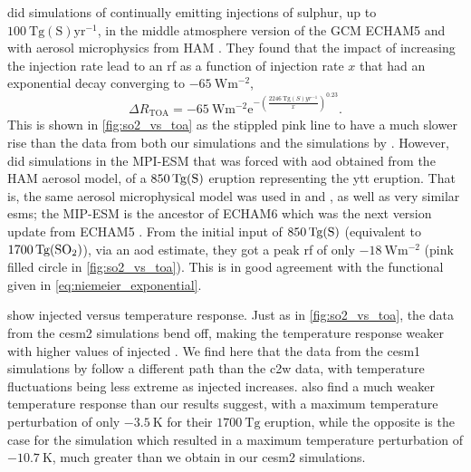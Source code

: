 \documentclass{ametsocV5}
\newcommand{\iso}[1][i]{{#1}njected \ce{SO2}}
\begin{document}
\citet{niemeier2015} did simulations of continually emitting injections of sulphur, up
to \(\SI{100}{\tera\gram \mathrm{(S)}\mathrm{yr}^{-1}}\), in the middle atmosphere
version of the GCM ECHAM5 \citep{giorgetta2006} and with aerosol microphysics from HAM
\citep{stier2005}. They found that the impact of increasing the injection rate lead to
an \ac{rf} as a function of injection rate \(x\) that had an exponential decay
converging to \(\SI{-65}{\watt\meter^{-2}}\),
\begin{equation}
  \Delta
  R_{\mathrm{TOA}} =
  -\SI{65}{\watt\metre^{-2}}
  \mathrm{e}^{-{\left(\frac{\SI{2246}{\tera\gram(S)yr^{-1}}}{x}\right)}^{0.23}}.
  \label{eq:niemeier_exponential}
\end{equation}
%
This is shown in \cref{fig:so2_vs_toa} as the stippled pink line to have a much slower
rise than the data from both our simulations and the simulations by
\citet{ottobliesner2016}. However, \citet{timmreck2010} did simulations in the MPI-ESM
that was forced with \ac{aod} obtained from the HAM aerosol model, of a
\(\SI{850}{\tera\gram(\ce{S})}\) eruption representing the \ac{ytt} eruption. That is,
the same aerosol microphysical model was used in \citet{timmreck2010} and
\citet{niemeier2015}, as well as very similar \acp{esm}; the MIP-ESM is the ancestor of
ECHAM6 which was the next version update from ECHAM5 \citep{kuma2023}. From the initial
input of \(\SI{850}{\tera\gram(\ce{S})}\) (equivalent to
\(\SI{1700}{\tera\gram(\ce{SO2})}\)), via an \ac{aod} estimate, they got a peak \ac{rf}
of only \(\SI{-18}{\watt\metre^{-2}}\) (pink filled circle in \cref{fig:so2_vs_toa}).
This is in good agreement with the functional given in \cref{eq:niemeier_exponential}.

 show \iso{} versus temperature response. Just as in
\cref{fig:so2_vs_toa}, the data from the \ac{cesm2} simulations bend off, making the
temperature response weaker with higher values of \iso. We find here that the data from
the \ac{cesm1} simulations by \citet{ottobliesner2016} follow a different path than the
\ac{c2w} data, with temperature fluctuations being less extreme as \iso{} increases.
\citet{timmreck2010} also find a much weaker temperature response than our results
suggest, with a maximum temperature perturbation of only \(\SI{-3.5}{\kelvin}\) for
their \(\SI{1700}{\tera\gram}\)  eruption, while the opposite is the case for
the \citet{jones2005} simulation which resulted in a maximum temperature perturbation of
\(\SI{-10.7}{\kelvin}\), much greater than we obtain in our \ac{cesm2} simulations.
\end{document}
